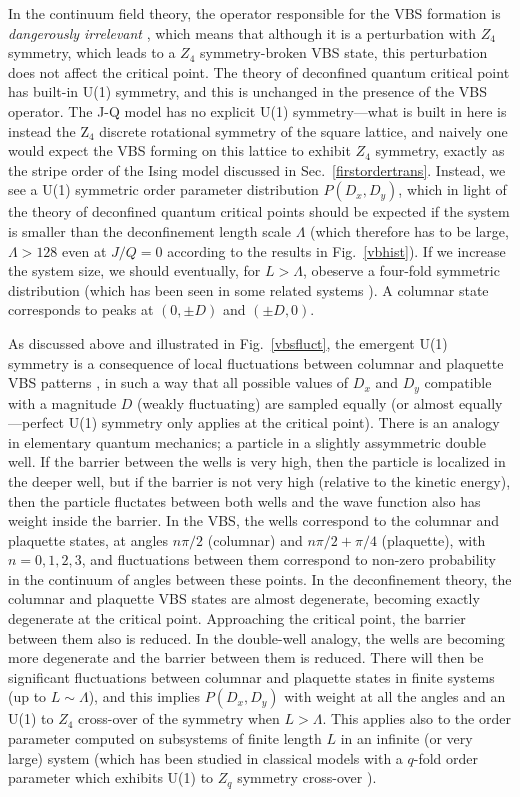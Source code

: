\documentclass[draft,numberedheadings]{aipproc}
\begin{document}
In the continuum field theory, the operator responsible for the VBS formation is {\it dangerously irrelevant} \cite{senthil1,levin04,metlitski08}, which 
means that although it is a perturbation with $Z_4$ symmetry, which leads to a $Z_4$ symmetry-broken VBS state, this perturbation does not affect the 
critical point. The theory of deconfined quantum critical point has built-in U(1) symmetry, and this is unchanged in the presence of the VBS operator. 
The J-Q model has no explicit U(1) symmetry---what is built in here is instead the Z$_4$ discrete rotational symmetry of the square lattice, and naively 
one would expect the VBS forming on this lattice to exhibit $Z_4$ symmetry, exactly as the stripe order of the Ising model discussed in Sec.~\ref{firstordertrans}.
Instead, we see a U(1) symmetric order parameter distribution $P(D_x,D_y)$, which in light of the theory of deconfined quantum critical points should
be expected if the system is smaller than the deconfinement length scale $\Lambda$ (which therefore has to be large, $\Lambda > 128$ even at
$J/Q=0$ according to the results in Fig.~\ref{vbhist}). If we increase the system size, we should eventually, for $L>\Lambda$, obeserve a four-fold 
symmetric distribution (which has been seen in some related systems \cite{lou1,lou09,beach09}). A columnar state corresponds to peaks at $(0,\pm D)$ and 
$(\pm D,0)$. 

As discussed above and illustrated in Fig.~\ref{vbsfluct}, the emergent U(1) symmetry is a consequence of local fluctuations between columnar and plaquette 
VBS patterns \cite{levin04}, in such a way that all possible values of $D_x$ and $D_y$ compatible with a magnitude $D$ (weakly fluctuating) are sampled 
equally (or almost equally---perfect U(1) symmetry only applies at the critical point). There is an analogy in elementary quantum mechanics; 
a particle in a slightly assymmetric double well. If the barrier between the wells is very high, then the particle is localized in the deeper well, but if 
the barrier is not very high (relative to the kinetic energy), then the particle fluctates between both wells and the wave function also has weight inside 
the barrier. In the VBS, the wells correspond to the columnar and plaquette states, at angles $n\pi/2$ (columnar) and $n\pi/2+\pi/4$ (plaquette), with 
$n=0,1,2,3$, and fluctuations between them correspond to non-zero probability in the continuum of angles between these points. In the deconfinement 
theory, the columnar and plaquette VBS states are almost degenerate, becoming exactly degenerate at the critical point. Approaching the 
critical point, the barrier between them also is reduced. In the double-well analogy, the wells are becoming more degenerate and the barrier between 
them is reduced. There will then be significant fluctuations between columnar and plaquette states in finite systems (up to $L \sim \Lambda$), and 
this implies $P(D_x,D_y)$ with weight at all the angles and an  U(1) to $Z_4$ cross-over of the symmetry when $L > \Lambda$. This applies also 
to the order parameter computed on subsystems of finite length $L$ in an infinite (or very large) system (which has been studied in classical 
models with a $q$-fold order parameter which exhibits  U(1) to $Z_q$ symmetry cross-over \cite{oshikawa00,hove03}).
\end{document}
